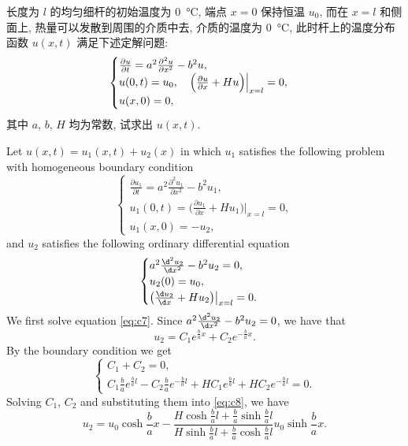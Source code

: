 \begin{exercise}
  长度为 $l$ 的均匀细杆的初始温度为 \qty{0}{\degreeCelsius}, 端点 $x=0$ 保持恒温 $u_0$,
  而在 $x=l$ 和侧面上, 热量可以发散到周围的介质中去, 介质的温度为 \qty{0}{\degreeCelsius},
  此时杆上的温度分布函数 $u(x,t)$ 满足下述定解问题:
  \[\begin{cases}
    \frac{\partial u}{\partial t} = a^2 \frac{\partial^2 u}{\partial x^2} - b^2 u, \\
    u(0,t) = u_0, \quad \Bigl(\frac{\partial u}{\partial x} + Hu\Bigr)\Big|_{x=l} = 0, \\
    u(x,0) = 0,
  \end{cases}\]
  其中 $a$, $b$, $H$ 均为常数, 试求出 $u(x,t)$.
\end{exercise}

\begin{solution}
    Let $u(x,t) = u_1(x,t) + u_2(x)$ in which $u_1$ satisfies the following 
    problem with homogeneous boundary condition
    \begin{equation}\label{eq:c6}
      \begin{cases}
        \frac{\partial u_1}{\partial t} = a^2 \frac{\partial^2 u_1}{\partial x^2} - b^2u_1, \\
        u_1(0,t) = \bigl(\frac{\partial u_1}{\partial x} + Hu_1\bigr)\big|_{x=l} = 0, \\
        u_1(x,0) = -u_2,
      \end{cases}
    \end{equation}
    and $u_2$ satisfies the following ordinary differential equation
    \begin{equation}\label{eq:c7}
      \begin{cases}
        a^2 \frac{\d^2 u_2}{\d x^2} - b^2 u_2 = 0, \\
        u_2(0) = u_0, \\
        \bigl(\frac{\d u_2}{\d x} + Hu_2\bigr)\big|_{x=l} = 0.
      \end{cases}
    \end{equation}
    We first solve equation \eqref{eq:c7}. Since $a^2 \frac{\d^2 u_2}{\d x^2} - b^2 u_2 = 0$,
    we have that
    \begin{equation}\label{eq:c8}
      u_2 = C_1 e^{\frac{b}{a}x} + C_2 e^{-\frac{b}{a}x}.
    \end{equation}
    By the boundary condition we get
    \[\begin{cases}
      C_1 + C_2 = 0, \\
      C_1\frac{b}{a}e^{\frac{b}{a}l} - C_2 \frac{b}{a} e^{-\frac{b}{a}l}
        + H C_1 e^{\frac{b}{a}l} + H C_2 e^{-\frac{b}{a}l} = 0.
    \end{cases}\]
    Solving $C_1$, $C_2$ and substituting them into \eqref{eq:c8}, we have
    \begin{equation}\label{eq:c9}
      u_2 = u_0 \cosh \frac{b}{a}x - \frac{H\cosh\frac{b}{a}l + \frac{b}{a}\sinh\frac{b}{a}l}
        {H\sinh\frac{b}{a}l + \frac{b}{a}\cosh\frac{b}{a}l}
        u_0 \sinh\frac{b}{a}x.
    \end{equation}


\end{solution}
